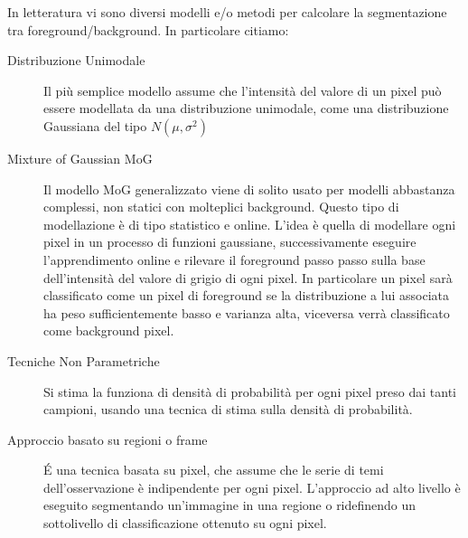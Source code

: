In letteratura vi sono diversi modelli e/o metodi per calcolare la segmentazione tra foreground/background. In particolare citiamo:
\begin{description}
 \item[Distribuzione Unimodale] Il più semplice modello assume che l'intensità del valore di un pixel può essere modellata da una distribuzione unimodale, come una distribuzione Gaussiana del tipo $N(\mu,\sigma^2)$
\item [Mixture of Gaussian MoG] Il modello MoG generalizzato viene di solito usato per modelli abbastanza complessi, non statici con molteplici background. Questo tipo di modellazione è di tipo statistico e online. L'idea è quella di modellare ogni pixel in un processo di funzioni gaussiane, successivamente eseguire l'apprendimento online e rilevare il foreground passo passo sulla base dell'intensità del valore di grigio di ogni pixel.
In particolare un pixel sarà classificato come un pixel di foreground se la distribuzione a lui associata ha peso sufficientemente basso e varianza alta, viceversa verrà classificato come background pixel.
\item [Tecniche Non Parametriche] Si stima la funziona di densità di probabilità per ogni pixel preso dai tanti campioni, usando una tecnica di stima sulla densità di probabilità.
\item [Approccio basato su regioni o frame] \'E una tecnica basata su pixel, che assume che le serie di temi dell'osservazione è indipendente per ogni pixel. L'approccio ad alto livello è eseguito segmentando un'immagine in una regione o ridefinendo un sottolivello di classificazione ottenuto su ogni pixel.
 \end{description}

